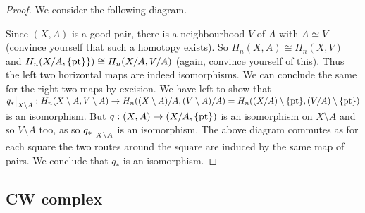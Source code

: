 \begin{proof}
  We consider the following diagram.


  Since $(X,A)$ is a good pair, there is a neighbourhood $V$ of $A$ with $A \simeq V$ (convince yourself that such a homotopy exists). So $H_n(X, A) \cong H_n(X,V)$ and $H_n(X/A, \{\operatorname{pt}\}\}) \cong H_n(X/A, V/A)$ (again, convince yourself of this). Thus the left two horizontal maps are indeed isomorphisms. We can conclude the same for the right two maps by excision. We have left to show that $\restr{q_*}{X\setminus A}: H_n(X \setminus A, V \setminus A) \to H_n((X \setminus A)/A, (V\setminus A)/A) = H_n((X/A) \setminus \{\pt\}, (V/A) \setminus \{\pt\})$ is an isomorphism. But $q: (X,A) \to (X/A, \{\operatorname{pt}\})$ is an isomorphism on $X \setminus A$ and so $V \setminus A$ too, as so $\restr{q_*}{X\setminus A}$ is an isomorphism. The above diagram commutes as for each square the two routes around the square are induced by the same map of pairs. We conclude that $q_*$ is an isomorphism.
\end{proof}

\subsection{CW complex}

